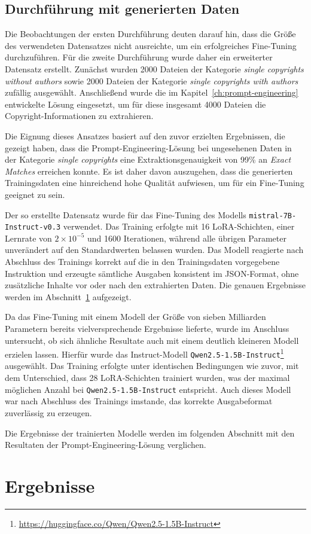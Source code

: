 \subsection{Durchführung mit generierten Daten}

Die Beobachtungen der ersten Durchführung deuten darauf hin, dass die Größe des verwendeten Datensatzes nicht ausreichte, um ein erfolgreiches Fine-Tuning durchzuführen.
Für die zweite Durchführung wurde daher ein erweiterter Datensatz erstellt.
Zunächst wurden 2000 Dateien der Kategorie \textit{single copyrights without authors} sowie 2000 Dateien der Kategorie \textit{single copyrights with authors} zufällig ausgewählt.
Anschließend wurde die im Kapitel~\ref{ch:prompt-engineering} entwickelte Lösung eingesetzt, um für diese insgesamt 4000 Dateien die Copyright-Informationen zu extrahieren.

Die Eignung dieses Ansatzes basiert auf den zuvor erzielten Ergebnissen, die gezeigt haben, dass die Prompt-Engineering-Lösung bei ungesehenen Daten in der Kategorie \textit{single copyrights} eine Extraktionsgenauigkeit von \num{99}\% an \textit{Exact Matches} erreichen konnte.
Es ist daher davon auszugehen, dass die generierten Trainingsdaten eine hinreichend hohe Qualität aufwiesen, um für ein Fine-Tuning geeignet zu sein.

Der so erstellte Datensatz wurde für das Fine-Tuning des Modells \texttt{mistral-7B-Instruct-v0.3} verwendet.
Das Training erfolgte mit 16 LoRA-Schichten, einer Lernrate von $2 \times 10^{-5}$ und \num{1600} Iterationen, während alle übrigen Parameter unverändert auf den Standardwerten belassen wurden.
Das Modell reagierte nach Abschluss des Trainings korrekt auf die in den Trainingsdaten vorgegebene Instruktion und erzeugte sämtliche Ausgaben konsistent im JSON-Format, ohne zusätzliche Inhalte vor oder nach den extrahierten Daten.
Die genauen Ergebnisse werden im Abschnitt~\ref{sec:lora-ergebnisse} aufgezeigt.

Da das Fine-Tuning mit einem Modell der Größe von sieben Milliarden Parametern bereits vielversprechende Ergebnisse lieferte, wurde im Anschluss untersucht, ob sich ähnliche Resultate auch mit einem deutlich kleineren Modell erzielen lassen.
Hierfür wurde das Instruct-Modell \texttt{Qwen2.5-1.5B-Instruct}\footnote{\url{https://huggingface.co/Qwen/Qwen2.5-1.5B-Instruct}} ausgewählt.
Das Training erfolgte unter identischen Bedingungen wie zuvor, mit dem Unterschied, dass 28 LoRA-Schichten trainiert wurden, was der maximal möglichen Anzahl bei \texttt{Qwen2.5-1.5B-Instruct} entspricht.
Auch dieses Modell war nach Abschluss des Trainings imstande, das korrekte Ausgabeformat zuverlässig zu erzeugen.

Die Ergebnisse der trainierten Modelle werden im folgenden Abschnitt mit den Resultaten der Prompt-Engineering-Lösung verglichen.

\section{Ergebnisse}\label{sec:lora-ergebnisse}







